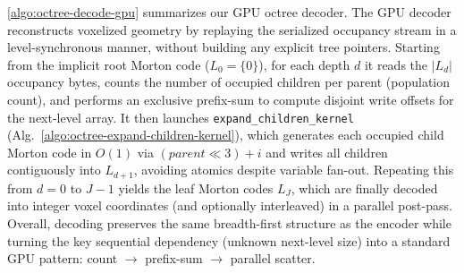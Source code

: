 \begin{algorithm}[t!]
  \caption{\texttt{expand\_children\_kernel}: Expand occupied children and generate Morton codes}
  \label{algo:octree-expand-children-kernel}
\SetAlgoLined
\DontPrintSemicolon
{}


\end{algorithm}
%
\cref{algo:octree-decode-gpu} summarizes our GPU octree decoder.
%
The GPU decoder reconstructs voxelized geometry by replaying the serialized occupancy stream in a level-synchronous manner, without building any explicit tree pointers.
%
Starting from the implicit root Morton code ($L_0=\{0\}$), for each depth $d$ it reads the $|L_d|$ occupancy bytes, counts the number of occupied children per parent (population count), and performs an exclusive prefix-sum to compute disjoint write offsets for the next-level array.
%
It then launches \texttt{expand\_children\_kernel} (Alg.~\ref{algo:octree-expand-children-kernel}), which generates each occupied child Morton code in $O(1)$ via $(parent \ll 3)+i$ and writes all children contiguously into $L_{d+1}$, avoiding atomics despite variable fan-out.
%
Repeating this from $d=0$ to $J{-}1$ yields the leaf Morton codes $L_J$, which are finally decoded into integer voxel coordinates (and optionally interleaved) in a parallel post-pass.
%
Overall, decoding preserves the same breadth-first structure as the encoder while turning the key sequential dependency (unknown next-level size) into a standard GPU pattern: count $\rightarrow$ prefix-sum $\rightarrow$ parallel scatter.



